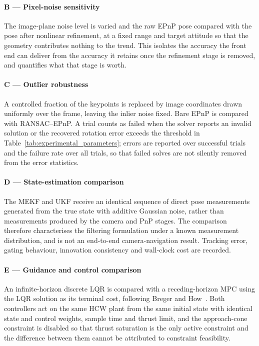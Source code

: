 \paragraph{B --- Pixel-noise sensitivity}
The image-plane noise level is varied and the raw EPnP pose compared with the
pose after nonlinear refinement, at a fixed range and target attitude so that
the geometry contributes nothing to the trend. This isolates the accuracy the
front end can deliver from the accuracy it retains once the refinement stage
is removed, and quantifies what that stage is worth.

\paragraph{C --- Outlier robustness}
A controlled fraction of the keypoints is replaced by image coordinates drawn
uniformly over the frame, leaving the inlier noise fixed. Bare EPnP is
compared with RANSAC--EPnP. A trial counts as failed when the solver reports
an invalid solution or the recovered rotation error exceeds the threshold in
Table~\ref{tab:experimental_parameters}; errors are reported over successful
trials and the failure rate over all trials, so that failed solves are not
silently removed from the error statistics.

\paragraph{D --- State-estimation comparison}
The MEKF and UKF receive an identical sequence of direct pose measurements
generated from the true state with additive Gaussian noise, rather than
measurements produced by the camera and PnP stages. The comparison therefore
characterises the filtering formulation under a known measurement
distribution, and is not an end-to-end camera-navigation result. Tracking
error, gating behaviour, innovation consistency and wall-clock cost are
recorded.

\paragraph{E --- Guidance and control comparison}
An infinite-horizon discrete LQR \cite{anderson1990} is compared with a
receding-horizon MPC \cite{mayne2000} using the LQR solution as its terminal
cost, following Breger and How~\cite{breger2008}. Both controllers act on the
same HCW plant from the same initial state with identical state and control
weights, sample time and thrust limit, and the approach-cone constraint is
disabled so that thrust saturation is the only active constraint and the
difference between them cannot be attributed to constraint feasibility.


